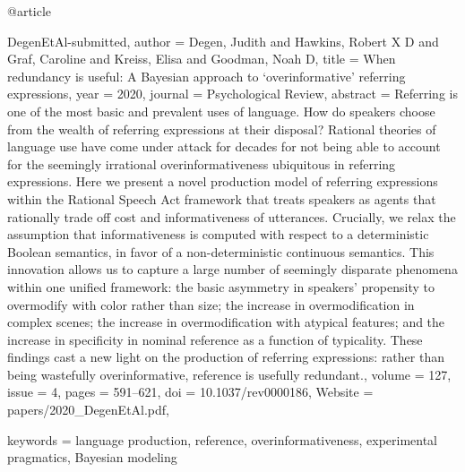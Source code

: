 {@article{DegenEtAl-submitted,
author = {Degen, Judith and Hawkins, Robert X D and Graf, Caroline and Kreiss, Elisa and Goodman, Noah D},
title = {{When redundancy is useful: A Bayesian approach to `overinformative' referring expressions}},
year = {2020},
journal = {Psychological Review},
abstract = {Referring is one of the most basic and prevalent uses of language. How do speakers choose from the wealth of referring expressions at their disposal? Rational theories of language use have come under attack for decades for not being able to account for the seemingly irrational overinformativeness ubiquitous in referring expressions. Here we present a novel production model of referring expressions within the Rational Speech Act framework that treats speakers as agents that rationally trade off cost and informativeness of utterances. Crucially, we relax the assumption that informativeness is computed with respect to a deterministic Boolean semantics, in favor of a non-deterministic continuous semantics. This innovation allows us to capture a large number of seemingly disparate phenomena within one unified framework: the basic asymmetry in speakers' propensity to overmodify with color rather than size; the increase in overmodification in complex scenes; the increase in overmodification with atypical features; and the increase in specificity in nominal reference as a function of typicality. These findings cast a new light on the production of referring expressions: rather than being wastefully overinformative, reference is usefully redundant.},
volume = {127},
issue = {4},
pages = {591–621},
doi = {10.1037/rev0000186},
Website = {papers/2020_DegenEtAl.pdf},

keywords = {language production, reference, overinformativeness, experimental pragmatics, Bayesian modeling}}

}
